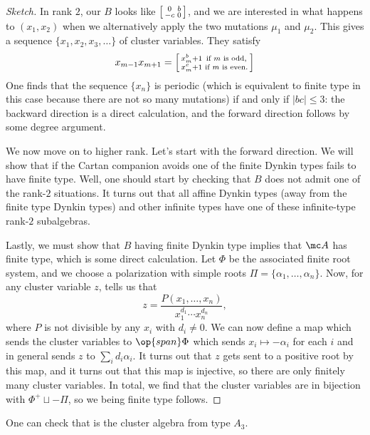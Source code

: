 \documentclass[../notes.tex]{subfiles}
\begin{document}
\begin{proof}[Sketch]
	In rank $2$, our $B$ looks like $\begin{bsmallmatrix}
		0 & b \\ -c & 0
	\end{bsmallmatrix}$, and we are interested in what happens to $(x_1,x_2)$ when we alternatively apply the two mutations $\mu_1$ and $\mu_2$. This gives a sequence $\{x_1,x_2,x_3,\ldots\}$ of cluster variables. They satisfy
	\[x_{m-1}x_{m+1}=\begin{bsmallmatrix}
		x_m^b+1 & \text{if }m\text{ is odd}, \\
		x_m^c+1 & \text{if }m\text{ is even}.
	\end{bsmallmatrix}\]
	One finds that the sequence $\{x_n\}$ is periodic (which is equivalent to finite type in this case because there are not so many mutations) if and only if $\left|bc\right|\le3$: the backward direction is a direct calculation, and the forward direction follows by some degree argument.

	We now move on to higher rank. Let's start with the forward direction. We will show that if the Cartan companion avoids one of the finite Dynkin types fails to have finite type. Well, one should start by checking that $B$ does not admit one of the rank-$2$ situations. It turns out that all affine Dynkin types (away from the finite type Dynkin types) and other infinite types have one of these infinite-type rank-$2$ subalgebras.

	Lastly, we must show that $B$ having finite Dynkin type implies that $\mc A$ has finite type, which is some direct calculation. Let $\Phi$ be the associated finite root system, and we choose a polarization with simple roots $\Pi=\{\alpha_1,\ldots,\alpha_n\}$. Now, for any cluster variable $z$,  tells us that
	\[z=\frac{P(x_1,\ldots,x_n)}{x_1^{d_1}\cdots x_n^{d_n}},\]
	where $P$ is not divisible by any $x_i$ with $d_i\ne0$. We can now define a map which sends the cluster variables to $\op{span}\Phi$ which sends $x_i\mapsto-\alpha_i$ for each $i$ and in general sends $z$ to $\sum_id_i\alpha_i$. It turns out that $z$ gets sent to a positive root by this map, and it turns out that this map is injective, so there are only finitely many cluster variables. In total, we find that the cluster variables are in bijection with $\Phi^+\sqcup-\Pi$, so we being finite type follows.
\end{proof}
\begin{example}
	One can check that  is the cluster algebra from type $A_3$.
\end{example}
\end{document}
